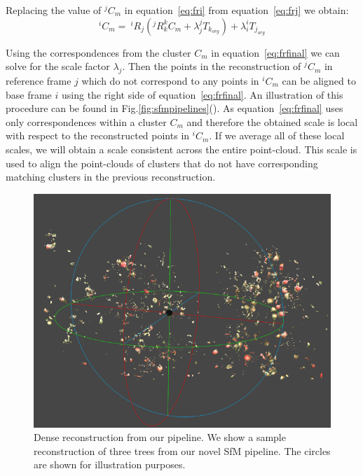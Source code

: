 Replacing the value of $^j{C_m}$ in equation~\eqref{eq:fri} from equation~\eqref{eq:frj} we obtain:
\begin{equation}
^i{C_m} =\ ^i R_j(^jR_k ^k{C_m} + \lambda_j ^jT_{k_{org}}) + \lambda_i ^iT_{j_{org}}
\label{eq:frfinal}
\end{equation}

Using the correspondences from the cluster $C_m$ in equation~\eqref{eq:frfinal} we can solve for the scale factor $\lambda_j$. Then the points in the reconstruction of $^j C_m$ in reference frame $j$ which do not correspond to any points in $^i C_m$ can be aligned to base frame $i$ using the right side of equation~\eqref{eq:frfinal}. An illustration of this procedure can be found in Fig.\ref{fig:sfmpipelines}(). As equation~\eqref{eq:frfinal} uses only correspondences within a cluster $C_m$ and therefore the obtained scale is local with respect to the reconstructed points in $^i C_m$. If we average all of these local scales, we will obtain a scale consistent across the entire point-cloud.  This scale is used to align the point-clouds of clusters that do not have corresponding matching clusters in the previous reconstruction.
 \begin{figure}[!h]
       \centering
       \includegraphics[width=.7\textwidth]{figures/isfm/3dcircle1.png}
        \caption[Dense reconstruction from our pipeline.]{Dense reconstruction from our pipeline. We show a sample reconstruction of three trees from our novel SfM pipeline. The circles are shown for illustration purposes.}
\label{fig:recon}
\end{figure}



